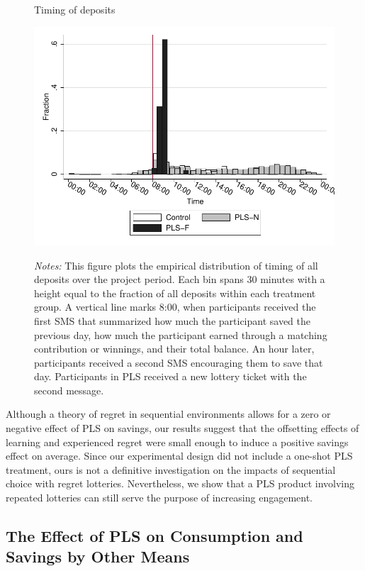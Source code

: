 \documentclass[12pt, titlepage]{article}
\begin{document}
		\begin{figure}[ht]
		\centering
		\caption{Timing of deposits}
		\includegraphics[width=\textwidth]{../../figures/hist-deposits.pdf}
		\label{fig:hist-deposits}
		\caption*{\footnotesize \emph{Notes:} This figure plots the empirical distribution of timing of all deposits over the project period. Each bin spans 30 minutes with a height equal to the fraction of all deposits within each treatment group. A vertical line marks 8:00, when participants received the first SMS that summarized how much the participant saved the previous day, how much the participant earned through a matching contribution or winnings, and their total balance. An hour later, participants received a second SMS encouraging them to save that day. Participants in PLS received a new lottery ticket with the second message.}
		\end{figure}

		Although a theory of regret in sequential environments allows for a zero or negative effect of PLS on savings, our results suggest that the offsetting effects of learning and experienced regret were small enough to induce a positive savings effect on average. Since our experimental design did not include a one-shot PLS treatment, ours is not a definitive investigation on the impacts of sequential choice with regret lotteries. Nevertheless, we show that a PLS product involving repeated lotteries can still serve the purpose of increasing engagement.

		\clearpage

	\subsection{The Effect of PLS on Consumption and Savings by Other Means}
\end{document}
